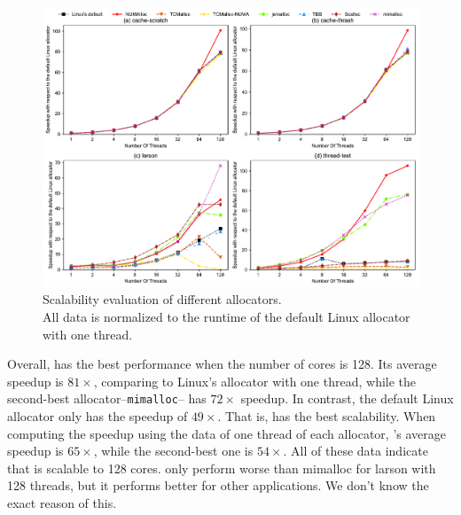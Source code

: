 \begin{figure}[!th]
    \centering
    \includegraphics[width=\textwidth]{figure/sythentic-scalobility-new.pdf}
    \caption{Scalability evaluation of different allocators.\\ All data is normalized to the runtime of the default Linux allocator with one thread.}
    \label{sythentic-scalability}
\end{figure}

Overall, \NM{} has the best performance when the number of cores is 128. Its average speedup is $81\times$, comparing to Linux's allocator with one thread, while the second-best allocator--\texttt{mimalloc}-- has $72\times$ speedup. In contrast, the default Linux allocator only has the speedup of $49\times$. That is, \NM{} has the best scalability. When computing the speedup using the data of one thread of each allocator, \NM{}'s average speedup is $65\times$, while the second-best one is $54\times$. All of these data indicate that \NM{} is scalable to 128 cores. \NM{} only perform worse than mimalloc for larson with 128 threads, but it performs better for other applications. We don't know the exact reason of this.  


